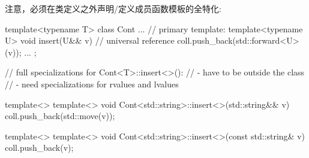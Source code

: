 注意，必须在类定义之外声明/定义成员函数模板的全特化:

\begin{cppcode}
template<typename T>
class Cont {
	...
	// primary template:
	template<typename U>
	void insert(U&& v) { // universal reference
		coll.push_back(std::forward<U>(v));
	}
	...
};

// full specializations for Cont<T>::insert<>():
// - have to be outside the class
// - need specializations for rvalues and lvalues

template<>
  template<>
void Cont<std::string>::insert<>(std::string&& v)
{
	coll.push_back(std::move(v));
}

template<>
  template<>
void Cont<std::string>::insert<>(const std::string& v)
{
	coll.push_back(v);
}
\end{cppcode}

















































